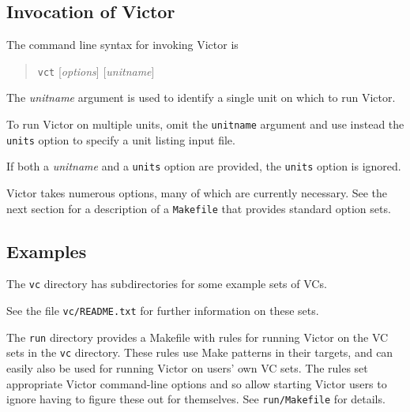 \documentclass[12pt,fleqn]{article}
\newcommand{\spark}{\textsc{Spark}}
\begin{document}
\subsection{Invocation of Victor}
The command line syntax for invoking Victor is
\begin{quote}
  \texttt{vct} [\textit{options}] [\textit{unitname}] 
\end{quote}
The \textit{unitname} argument is used to identify a single unit on which 
to run Victor.

To run Victor on multiple units, omit the \texttt{unitname} argument
and use instead the \texttt{units} option to specify a unit listing
input file.

If both a \textit{unitname} and a \texttt{units} option are provided,
the \texttt{units} option is ignored.

Victor takes numerous options, many of which are currently necessary.
See the next section for a description of a \texttt{Makefile} that
provides standard option sets.


\subsection{Examples}
\label{sec:examples}

The \texttt{vc} directory has subdirectories for some example 
sets of VCs.

See the file \texttt{vc/README.txt} for further information on these sets.

The \texttt{run} directory provides a Makefile with rules for
running Victor on the VC sets in the \texttt{vc} directory.
%
These rules use Make patterns in their targets, and can easily also be
used for running Victor on users' own VC sets.
%
The rules set appropriate Victor command-line options and so allow
starting Victor users to ignore having to figure these out for
themselves.
%
See \texttt{run/Makefile} for details.
\end{document}
